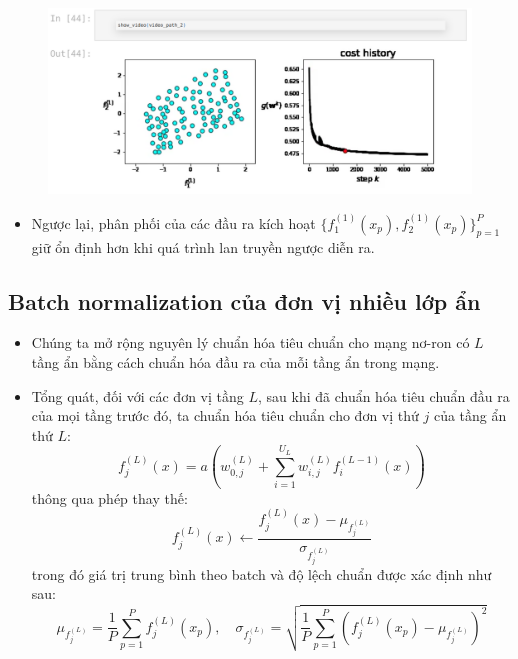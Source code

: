 \documentclass{book}
\begin{document}
\begin{itemize}
    \begin{figure}[H]
        \centering
        \includegraphics[width=1.0\linewidth]{images/video2.png}
        \label{fig:video2}
    \end{figure}
    \begin{itemize}
        \item Ngược lại, phân phối của các đầu ra kích hoạt $\{f^{(1)}_1(x_{p}), f^{(1)}_2(x_{p})\}_{p=1}^{P}$ giữ ổn định hơn khi quá trình lan truyền ngược diễn ra.
    \end{itemize}

    \end{itemize}

    \subsection{Batch normalization của đơn vị nhiều lớp ẩn}
    \begin{itemize}
        \item Chúng ta mở rộng nguyên lý chuẩn hóa tiêu chuẩn cho mạng nơ-ron có $L$ tầng ẩn bằng cách chuẩn hóa đầu ra của mỗi tầng ẩn trong mạng.
        \item Tổng quát, đối với các đơn vị tầng $L$, sau khi đã chuẩn hóa tiêu chuẩn đầu ra của mọi tầng trước đó, ta chuẩn hóa tiêu chuẩn cho đơn vị thứ $j$ của tầng ẩn thứ $L$:
        \[
        f^{(L)}_j(x) = a\left(w^{(L)}_{0,j} + \sum_{i=1}^{U_{L}} w^{(L)}_{i,j} f^{(L-1)}_i(x)\right)
        \]
        thông qua phép thay thế:
        \[
        f^{(L)}_j(x) \leftarrow \frac{f^{(L)}_j(x) - \mu_{f^{(L)}_j}}{\sigma_{f^{(L)}_j}}
        \]
        trong đó giá trị trung bình theo batch và độ lệch chuẩn được xác định như sau:
        \[
        \mu_{f^{(L)}_j} = \frac{1}{P} \sum_{p=1}^{P} f^{(L)}_j(x_{p}), \quad
        \sigma_{f^{(L)}_j} = \sqrt{ \frac{1}{P} \sum_{p=1}^{P} \left(f^{(L)}_j(x_{p}) - \mu_{f^{(L)}_j}\right)^2 }
        \]
    \end{itemize}
\end{document}
